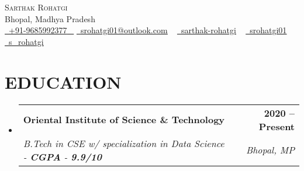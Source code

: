 \documentclass[letterpaper,11pt]{article}
\makeatletter
\newcommand{\resumeSubheading}[4]{
  \vspace{-2pt}\item
    \begin{tabular*}{1.0\textwidth}[t]{l@{\extracolsep{\fill}}r}
      \textbf{\large#1} & \textbf{\small #2} \\
      \textit{\large#3} & \textit{\small #4} \\
      
    \end{tabular*}\vspace{-7pt}
}
\newcommand{\resumeSubHeadingListStart}{\begin{itemize}[leftmargin=0.0in, label={}]}
\newcommand{\resumeSubHeadingListEnd}{\end{itemize}}
\makeatother
\begin{document}


\begin{center}
    {\Huge \scshape Sarthak Rohatgi} \\ \vspace{1pt}
    Bhopal, Madhya Pradesh \\ \vspace{1pt}
    \small \href{tel:+919685992377}{ \raisebox{-0.1\height}\faPhone\ \underline{+91-9685992377} ~} \href{mailto:srohatgi01@outlook.com}{\raisebox{-0.2\height}\faEnvelope\  \underline{srohatgi01@outlook.com}} ~ 
    \href{https://linkedin.com/in/sarthak-rohatgi}{\raisebox{-0.2\height}\faLinkedinSquare\ \underline{sarthak-rohatgi}}  ~
    \href{https://github.com/srohatgi01}{\raisebox{-0.2\height}\faGithub\ \underline{srohatgi01}} ~
    \href{https://www.hackerrank.com/s_rohatgi}{\raisebox{-0.2\height}\faHackerrank\ \underline{s\_rohatgi}} ~
    \vspace{-8pt}
\end{center}


\section{EDUCATION}
  \resumeSubHeadingListStart
    \resumeSubheading
      {Oriental Institute of Science \& Technology}{2020 -- Present}
      {B.Tech in CSE w/ specialization in Data Science - \textbf{CGPA} - \textbf{9.9/10}}{Bhopal, MP}
  \resumeSubHeadingListEnd
  

\end{document}
